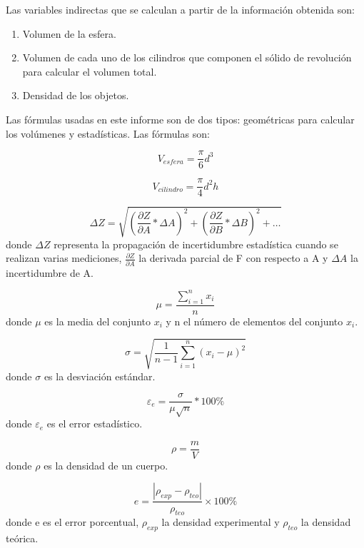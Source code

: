 \documentclass[a4paper]{article}
\begin{document}
Las variables indirectas que se calculan a partir de la información obtenida son:
\begin{enumerate}
  \item Volumen de la esfera.
  \item Volumen de cada uno de los cilindros que componen el sólido de revolución para calcular el volumen total.
  \item Densidad de los objetos.
\end{enumerate}

Las fórmulas usadas en este informe son de dos tipos: geométricas para calcular los volúmenes y estadísticas. Las fórmulas son: 

\begin{equation}
V_{esfera}=\frac{\pi}{6}d^3
\end{equation}

\begin{equation}
V_{cilindro}=\frac{\pi}{4}d^2h
\end{equation}

\begin{equation}
\Delta Z = \sqrt{{(\frac{\partial Z}{\partial A}*\Delta A)}^2+{(\frac{\partial Z}{\partial B}*\Delta B)}^2+\dots}
\end{equation}
donde $\Delta Z$ representa la propagación de incertidumbre estadística cuando se realizan varias mediciones, $\frac{\partial Z}{\partial A}$ la derivada parcial de F con respecto a A y $\Delta A$ la incertidumbre de A.

\begin{equation}
\mu= \frac{\displaystyle\sum_{i=1}^{n} x_i}{n}
\end{equation}
donde $\mu$ es la media del conjunto $x_i$ y n el número de elementos del conjunto $x_i$.

\begin{equation}
\sigma = \sqrt{\frac{1}{n-1}\displaystyle\sum_{i=1}^{n} {(x_i-\mu)}^2}
\end{equation}
donde $\sigma$ es la desviación estándar.

\begin{equation}
\varepsilon_e=\frac{\sigma}{\mu \sqrt{n}}*100\%
\end{equation}
donde $\varepsilon_e$ es el error estadístico.

\begin{equation}
\rho=\frac{m}{V}
\end{equation}
donde $\rho$ es la densidad de un cuerpo.

\begin{equation}
e=\frac{|\rho_{exp}-\rho_{teo}|}{\rho_{teo}}\times 100\%
\end{equation}
donde e es el error porcentual, $\rho_{exp}$ la densidad experimental y $\rho_{teo}$ la densidad teórica.
\end{document}
